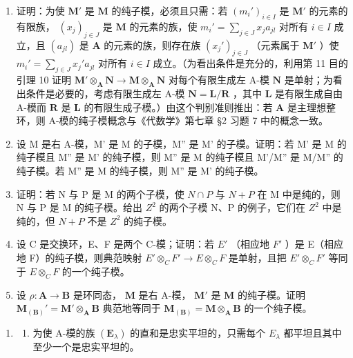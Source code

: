 \begin{enumerate}
\def\labelenumi{(\alph{enumi})}
\item
  证明：为使 \(\mathbf{M}'\) 是 \(\mathbf{M}\) 的纯子模，必须且只需：若 \((m_i')_{i\in I}\) 是 \(\mathbf{M}'\) 的元素的有限族， \((x_j)_{j\in J}\) 是 \(\mathbf{M}\) 的元素的族，使 \(m_i' = \sum_{j\in J} x_j a_{jl}\) 对所有 \(i\in I\) 成立，且 \((a_{jl})\) 是 \(\mathbf{A}\) 的元素的族，则存在族 \((x_j')_{j\in J}\) （元素属于 \(\mathbf{M}'\) ）使 \(m_i' = \sum_{j\in J} x_j' a_{jl}\) 对所有 \(i\in I\) 成立。（为看出条件是充分的，利用第 11 目的引理 10 证明 \(\mathbf{M}' \otimes_{\mathbf{A}} \mathbf{N} \to \mathbf{M} \otimes_{\mathbf{A}} \mathbf{N}\) 对每个有限生成左 A-模 \(\mathbf{N}\) 是单射；为看出条件是必要的，考虑有限生成左 A-模 \(\mathbf{N} = \mathbf{L}/\mathbf{R}\) ，其中 \(\mathbf{L}\) 是有限生成自由 A-模而 \(\mathbf{R}\) 是 \(\mathbf{L}\) 的有限生成子模。）由这个判别准则推出：若 \(\mathbf{A}\) 是主理想整环，则 A-模的纯子模概念与《代数学》第七章 §2 习题 7 中的概念一致。
\item
  设 M 是右 A-模，M' 是 M 的子模，M'' 是 M' 的子模。证明：若 M' 是 M 的纯子模且 M'' 是 M' 的纯子模，则 M'' 是 M 的纯子模且 M'/M'' 是 M/M'' 的纯子模。若 M'' 是 M 的纯子模，则 M'' 是 M' 的纯子模。
\item
  证明：若 N 与 P 是 M 的两个子模，使 \(N \cap P\) 与 \(N + P\) 在 M 中是纯的，则 N 与 P 是 M 的纯子模。给出 \(Z^{2}\) 的两个子模 N、P 的例子，它们在 \(Z^{2}\) 中是纯的，但 \(N + P\) 不是 \(Z^{2}\) 的纯子模。
\item
  设 C 是交换环，E、F 是两个 C-模；证明：若 \(E'\) （相应地 \(F'\) ）是 E（相应地 F）的纯子模，则典范映射 \(E' \otimes_{C} F' \to E \otimes_{C} F\) 是单射，且把 \(E' \otimes_{C} F'\) 等同于 \(E \otimes_{C} F\) 的一个纯子模。
\item
  设 \(\rho: \mathbf{A} \to \mathbf{B}\) 是环同态， \(\mathbf{M}\) 是右 A-模， \(\mathbf{M}'\) 是 \(\mathbf{M}\) 的纯子模。证明 \(\mathbf{M}_{(\mathbf{B})}' = \mathbf{M}' \otimes_{\mathbf{A}} \mathbf{B}\) 典范地等同于 \(\mathbf{M}_{(\mathbf{B})} = \mathbf{M} \otimes_{\mathbf{A}} \mathbf{B}\) 的一个纯子模。
\end{enumerate}


\begin{enumerate}
\def\labelenumi{\arabic{enumi}.}
\tightlist
\item
  \begin{enumerate}
  \def\labelenumii{(\alph{enumii})}
  \tightlist
  \item
  为使 A-模的族 \((\mathbf{E}_{\lambda})\) 的直和是忠实平坦的，只需每个 \(E_{\lambda}\) 都平坦且其中至少一个是忠实平坦的。
  \end{enumerate}
\end{enumerate}

